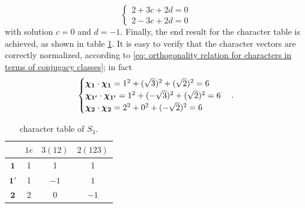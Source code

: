\begin{ex}
    \begin{equation}
        \begin{cases}
            2 + 3c + 2d = 0 \\
            2 - 3c + 2d = 0
        \end{cases}
    \end{equation}
    with solution $c = 0$ and $d = -1$. Finally, the end result for the character table is achieved, as shown in table \ref{tab: character table of S3}. It is easy to verify that the character vectors are correctly normalized, according to \eqref{eq: orthogonality relation for characters in terms of conjugacy classes}; in fact
    \begin{equation}
        \begin{cases}
            \bm{\chi}_{\bm{1}} \cdot \bm{\chi}_{\bm{1}} = 1^2 + (\sqrt{3})^2 + (\sqrt{2})^2 = 6 \\
            \bm{\chi}_{\bm{1'}} \cdot \bm{\chi}_{\bm{1'}} = 1^2 + (-\sqrt{3})^2 + (\sqrt{2})^2 = 6 \\
            \bm{\chi}_{\bm{2}} \cdot \bm{\chi}_{\bm{2}} = 2^2 + 0^2 + (-\sqrt{2})^2 = 6 
        \end{cases}.
    \end{equation}
        \begin{table}[h]
        \centering
        \begin{tabular}{|c|ccc|}
             \hline 
             & $1e$ & $3(12)$ & $2(123)$ \\ \hline 
             $\bm{1}$ & 1 & 1 & 1 \\
             $\bm{1'}$ & 1 & $-1$ & $1$ \\
             $\bm{2}$ & 2 & $0$ & $-1$ \\ \hline 
        \end{tabular}
        \caption{character table of $S_3$.}
        \label{tab: character table of S3}
    \end{table}
    

\end{ex}
